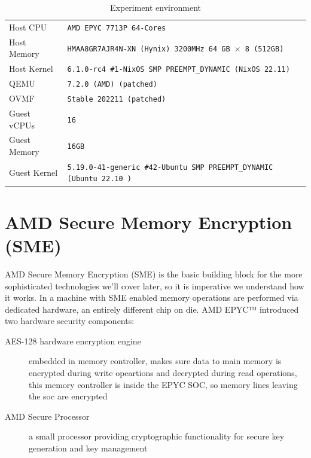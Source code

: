 \documentclass[twocolumn]{article}
\begin{document}
\begin{table}
    \centering
    \label{tab:experiment-environment}
    \begin{tabular}{l|l}
        \hline
        Host CPU      & \texttt{AMD EPYC 7713P 64-Cores} \\
        Host Memory   & \texttt{HMAA8GR7AJR4N-XN (Hynix) 3200MHz 64 GB $\times$ 8 (512GB)} \\
        Host Kernel   & \texttt{6.1.0-rc4 \#1-NixOS SMP PREEMPT\_DYNAMIC (NixOS 22.11)} \\
        QEMU          & \texttt{7.2.0 (AMD) (patched)} \\
        OVMF          & \texttt{Stable 202211 (patched)} \\
        Guest vCPUs   & \texttt{16} \\
        Guest Memory  & \texttt{16GB}  \\
        Guest Kernel  & \texttt{5.19.0-41-generic \#42-Ubuntu SMP PREEMPT\_DYNAMIC (Ubuntu 22.10 )} \\ 
        \hline
    \end{tabular}
    \caption{Experiment environment}
\end{table}

\section{AMD Secure Memory Encryption (SME)}
AMD Secure Memory Encryption (SME) is the basic building block for the more sophisticated technologies we'll cover later, so it is imperative we understand how it works. In a machine with SME enabled memory operations are performed via dedicated hardware, an entirely different chip on die. AMD EPYC™ introduced two hardware security components:
\begin{description}
    \item [AES-128 hardware encryption engine] embedded in memory controller, makes sure data to main memory is encrypted during write opeartions and decrypted during read operations, this memory controller is inside the EPYC SOC, so memory lines leaving the soc are encrypted
    \item [AMD Secure Processor] a small processor providing cryptographic functionality for secure key generation and key management
\end{description}
\end{document}

